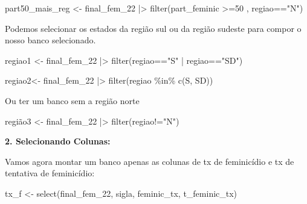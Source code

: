 \documentclass[
  letterpaper,
  DIV=11,
  numbers=noendperiod]{scrreprt}
\newenvironment{Shaded}{\begin{snugshade}}{\end{snugshade}}
\newcommand{\DecValTok}[1]{\textcolor[rgb]{0.68,0.00,0.00}{#1}}
\newcommand{\FunctionTok}[1]{\textcolor[rgb]{0.28,0.35,0.67}{#1}}
\newcommand{\NormalTok}[1]{\textcolor[rgb]{0.00,0.23,0.31}{#1}}
\newcommand{\OtherTok}[1]{\textcolor[rgb]{0.00,0.23,0.31}{#1}}
\newcommand{\SpecialCharTok}[1]{\textcolor[rgb]{0.37,0.37,0.37}{#1}}
\newcommand{\StringTok}[1]{\textcolor[rgb]{0.13,0.47,0.30}{#1}}
\begin{document}
\begin{Shaded}
\begin{Highlighting}[]
\NormalTok{part50\_mais\_reg }\OtherTok{\textless{}{-}}\NormalTok{ final\_fem\_22 }\SpecialCharTok{|\textgreater{}} 
  \FunctionTok{filter}\NormalTok{(part\_feminic }\SpecialCharTok{\textgreater{}=}\DecValTok{50}\NormalTok{ , regiao}\SpecialCharTok{==}\StringTok{"N"}\NormalTok{)}
\end{Highlighting}
\end{Shaded}

Podemos selecionar os estados da região sul ou da região sudeste para
compor o nosso banco selecionado.

\begin{Shaded}
\begin{Highlighting}[]
\NormalTok{regiao1 }\OtherTok{\textless{}{-}}\NormalTok{ final\_fem\_22 }\SpecialCharTok{|\textgreater{}} 
  \FunctionTok{filter}\NormalTok{(regiao}\SpecialCharTok{==}\StringTok{"S"} \SpecialCharTok{|}\NormalTok{ regiao}\SpecialCharTok{==}\StringTok{"SD"}\NormalTok{)}
\end{Highlighting}
\end{Shaded}

\begin{Shaded}
\begin{Highlighting}[]
\NormalTok{regiao2}\OtherTok{\textless{}{-}}\NormalTok{ final\_fem\_22 }\SpecialCharTok{|\textgreater{}} 
  \FunctionTok{filter}\NormalTok{(regiao }\SpecialCharTok{\%in\%} \FunctionTok{c}\NormalTok{(}\StringTok{\textquotesingle{}S\textquotesingle{}}\NormalTok{, }\StringTok{\textquotesingle{}SD\textquotesingle{}}\NormalTok{))}
\end{Highlighting}
\end{Shaded}

Ou ter um banco sem a região norte

\begin{Shaded}
\begin{Highlighting}[]
\NormalTok{região3 }\OtherTok{\textless{}{-}}\NormalTok{ final\_fem\_22 }\SpecialCharTok{|\textgreater{}} 
  \FunctionTok{filter}\NormalTok{(regiao}\SpecialCharTok{!=}\StringTok{"N"}\NormalTok{)}
\end{Highlighting}
\end{Shaded}

\textbf{2. Selecionando Colunas:}

Vamos agora montar um banco apenas as colunas de tx de feminicídio e tx
de tentativa de feminicídio:

\begin{Shaded}
\begin{Highlighting}[]
\NormalTok{tx\_f }\OtherTok{\textless{}{-}} \FunctionTok{select}\NormalTok{(final\_fem\_22, sigla, feminic\_tx, t\_feminic\_tx)}
\end{Highlighting}
\end{Shaded}
\end{document}
